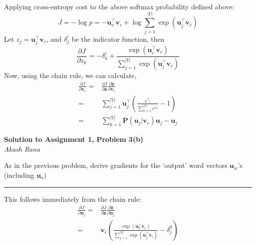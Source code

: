 \documentclass[letter,12pt]{article}
\newcommand{\myhwtitle}[3]
{\begin{center}
{\large {\bf Solution to Assignment {#1}, Problem {#2}}}\\
\medskip
{\it {#3}} %
\end{center}}
\newcommand{\solutionsAuthor}{Akash Rana}
\begin{document}
Applying cross-entropy cost to the above softmax probability defined above:
\begin{equation}
J =-\log{p} = - {\boldsymbol u}_{o}^{\top}{\boldsymbol v}_{c} + \log\sum^{\vert{V}\vert}_{j=1}\exp{({\boldsymbol u}_{j}^{\top}{\boldsymbol v}_{c})}
\end{equation}
Let $z_{j}={\boldsymbol u}_{j}^{\top}{\boldsymbol v}_{c}$, and $\delta^{i}_{j}$ be the indicator function, then
\begin{equation}
\frac{\partial J}{\partial{z_{k}}} = - \delta^{i}_{k} + \frac{\exp{({\boldsymbol u}_{i}^{\top}{\boldsymbol v}_{c})}}{\sum^{\vert{V}\vert}_{j=1}\exp{({\boldsymbol u}_{j}^{\top}{\boldsymbol v}_{c})}}
\end{equation}
Now, using the chain rule, we can calculate,
\begin{align}
\frac{\partial J}{\partial{{\boldsymbol v}_{c}}} =& \frac{\partial J}{\partial{{\boldsymbol z}}}\frac{\partial{{\boldsymbol z}}}{\partial{{\boldsymbol v}_{c}}} \\
                                                                    =& \sum^{\vert{V}\vert}_{j=1}{\boldsymbol u}_{j}^{\top}\left(\frac{e^{z_{j}}}{\sum^{\vert{V}\vert}_{k=1}e^{z_{k}}} -  1\right) \\
                                                                    =& \sum^{\vert{V}\vert}_{k=1}{\boldsymbol P}({\boldsymbol u}_{j} \vert {\boldsymbol v}_{c} ){\boldsymbol u}_{j} - {\boldsymbol u}_{j}
\end{align}
\clearpage

\myhwtitle{1}{3(b)}{\solutionsAuthor}

\bigskip
\noindent As in the previous problem, derive gradients for the `output' word vectors ${\boldsymbol u}_{w}$'s (including ${\boldsymbol u}_{o}$)\vspace{5mm}
\noindent\rule{\textwidth}{0.4pt}\vspace{5mm}
This follows immediately from the chain rule:
\begin{align}
\frac{\partial J}{\partial{\boldsymbol u}_{j}} = &\frac{\partial J}{\partial{{\boldsymbol z}}}\frac{\partial{{\boldsymbol z}}}{\partial{\boldsymbol u}_{j}} \\
                                                                  = &{\boldsymbol v}_{c}\left(\frac{\exp{({\boldsymbol u}^{\top}_{0}{\boldsymbol v}_{c})}}{\sum^{\vert{V}\vert}_{j=1}\exp{({\boldsymbol u}^{\top}_{j}{\boldsymbol v}_{c})}} - \delta^{0}_{j}\right)
\end{align}
\clearpage
\end{document}
